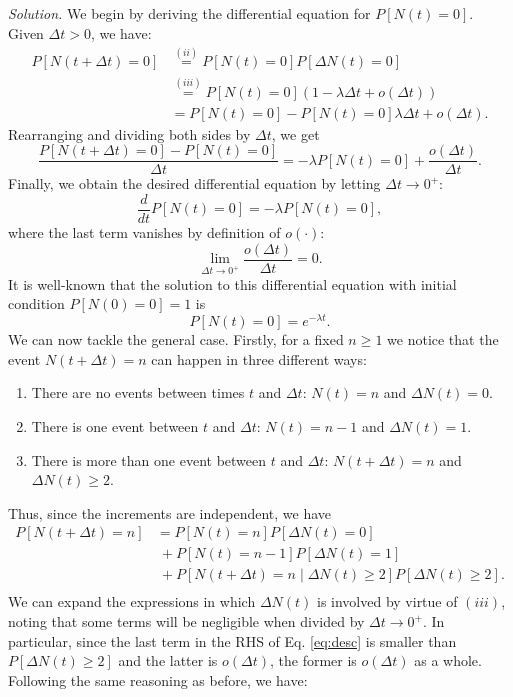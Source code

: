 \emph{Solution. }We begin by deriving the differential equation for \( P[N(t) = 0]\). Given $\Delta t > 0$, we have:
\[
  \begin{aligned}
    P[N(t + \Delta t) = 0] &\stackrel{(ii)}{=} P[N(t) = 0]P[\Delta N(t) = 0]\\
    &\stackrel{(iii)}{=} P[N(t) = 0](1- \lambda\Delta t + o(\Delta t))\\
    &= P[N(t) = 0] - P[N(t) = 0]\lambda\Delta t + o(\Delta t).
    \end{aligned}
  \]
  Rearranging and dividing both sides by \( \Delta t \), we get
  \[
    \frac{P[N(t + \Delta t) = 0] - P[N(t) = 0]}{\Delta t} = - \lambda P[N(t) = 0] + \frac{o(\Delta t)}{\Delta t}.
  \]
  Finally, we obtain the desired differential equation by letting $\Delta t \to 0^+$:
\[
  \frac{d}{dt}P[N(t) = 0] = -\lambda P[N(t) = 0],
\]
where the last term vanishes by definition of \( o(\cdot) \):
  \[
    \lim_{\Delta t \to 0^{+}}\frac{o(\Delta t)}{\Delta t} = 0.
  \]
It is well-known that the solution to this differential equation with initial condition \( P[N(0) = 0] = 1 \) is
\[
  P[N(t) = 0] = e^{-\lambda t}.
\]
We can now tackle the general case. Firstly, for a fixed \( n \geq 1 \) we notice that the event \(  N(t + \Delta t) = n \) can happen in three different ways:
\begin{enumerate}
  \item There are no events between times $t$ and \( \Delta t \): \(  N(t) = n \) and \(\Delta N(t) = 0\).
  \item There is one event between $t$ and \( \Delta t \): \(N(t) = n-1\) and \(\Delta N(t) = 1 \).
\item There is more than one event between $t$ and \( \Delta t \): \(  N(t + \Delta t) = n \) and \(\Delta N(t)  \geq 2\).
\end{enumerate}
Thus, since the increments are independent, we have
\begin{equation}
  \label{eq:desc}
  \begin{aligned}
    P[N(t + \Delta t) = n] &= P[N(t) = n]P[\Delta N(t) = 0]\\
    &\ + P[N(t) = n-1]P[\Delta N(t) = 1] \\
    &\ + P[N(t+\Delta t)=n \mid \Delta N(t)\geq 2]P[\Delta N(t)\geq 2].\\
    \end{aligned}
  \end{equation}
  We can expand the expressions in which $\Delta N(t)$ is involved by virtue of $(iii)$, noting that some terms will be negligible when divided by $\Delta t \to 0^+$. In particular, since the last term in the RHS of Eq. \eqref{eq:desc} is smaller than $P[\Delta N(t)\geq 2]$ and the latter is $o(\Delta t)$, the former is $o(\Delta t)$ as a whole. Following the same reasoning as before, we have:
